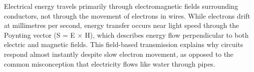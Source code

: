 Electrical energy travels primarily through electromagnetic fields surrounding conductors, not through the movement of electrons in wires. While electrons drift at millimetres per second, energy transfer occurs near light speed through the Poynting vector (S = E × H), which describes energy flow perpendicular to both electric and magnetic fields. This field-based transmission explains why circuits respond almost instantly despite slow electron movement, as opposed to the common misconception that electricity flows like water through pipes.

